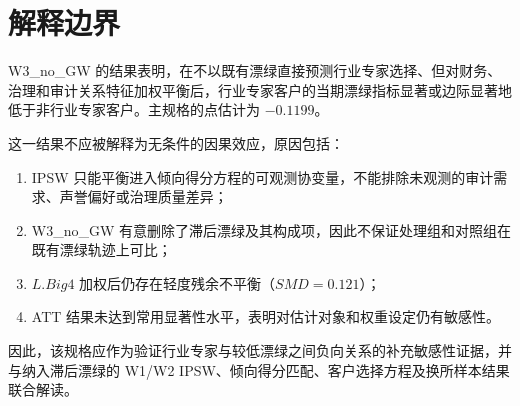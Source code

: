 \documentclass[12pt,a4paper]{article}
\begin{document}
\section{解释边界}

W3\_no\_GW 的结果表明，在不以既有漂绿直接预测行业专家选择、但对财务、治理和审计关系特征加权平衡后，行业专家客户的当期漂绿指标显著或边际显著地低于非行业专家客户。主规格的点估计为 $-0.1199$。

这一结果不应被解释为无条件的因果效应，原因包括：

\begin{enumerate}[label=(\arabic*)]
  \item IPSW 只能平衡进入倾向得分方程的可观测协变量，不能排除未观测的审计需求、声誉偏好或治理质量差异；
  \item W3\_no\_GW 有意删除了滞后漂绿及其构成项，因此不保证处理组和对照组在既有漂绿轨迹上可比；
  \item $L.Big4$ 加权后仍存在轻度残余不平衡（$SMD=0.121$）；
  \item ATT 结果未达到常用显著性水平，表明对估计对象和权重设定仍有敏感性。
\end{enumerate}

因此，该规格应作为验证行业专家与较低漂绿之间负向关系的补充敏感性证据，并与纳入滞后漂绿的 W1/W2 IPSW、倾向得分匹配、客户选择方程及换所样本结果联合解读。
\end{document}
